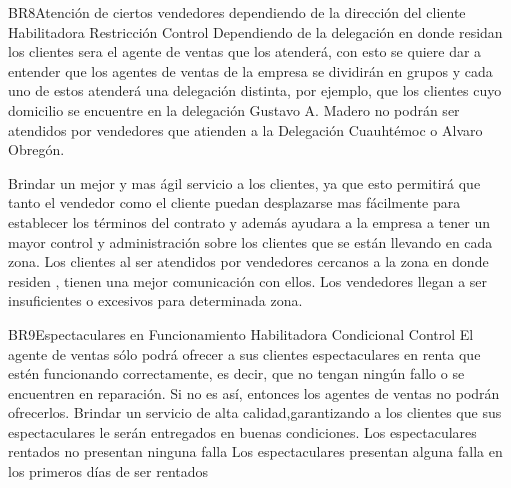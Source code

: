 \hypertarget{BR:BR8}{}
\begin{BussinesRule}{BR8}{Atención de ciertos vendedores dependiendo de la dirección del cliente}
    \BRitem[Tipo: ] Habilitadora
    \BRitem[Clase:] Restricción
    \BRitem[Nivel:] Control
    \BRitem[Descripción:]Dependiendo de la delegación en donde residan los clientes sera el agente de ventas que los atenderá, con esto se quiere dar a entender que los agentes de ventas de la empresa se dividirán en grupos y cada uno de estos atenderá una delegación distinta, por ejemplo, que  los clientes cuyo domicilio se encuentre en la delegación Gustavo A. Madero no podrán ser atendidos por vendedores que atienden a la Delegación Cuauhtémoc o Alvaro Obregón.
  
    \BRitem[Motivación: ]Brindar un mejor y mas ágil servicio a los clientes, ya que esto permitirá que tanto el vendedor como el cliente puedan desplazarse mas fácilmente para establecer los términos del contrato y además ayudara a la empresa a tener un mayor control y administración sobre los clientes que se están llevando en cada zona. 
     Los clientes al ser atendidos por vendedores cercanos a la zona en donde residen , tienen una mejor comunicación con ellos.
     Los vendedores llegan a ser insuficientes o excesivos para determinada zona.
\end{BussinesRule}

\hypertarget{BR:BR9}{}
\begin{BussinesRule}{BR9}{Espectaculares en Funcionamiento}
    \BRitem[Tipo: ] Habilitadora
    \BRitem[Clase:] Condicional
    \BRitem[Nivel:] Control
    \BRitem[Descripción:]El agente de ventas sólo podrá ofrecer a sus clientes espectaculares en renta que estén funcionando correctamente, es decir, que no tengan ningún fallo o se encuentren en reparación. Si no es así, entonces los agentes de ventas no podrán ofrecerlos. 
    \BRitem[Motivación:] Brindar un servicio de alta calidad,garantizando a los clientes que sus espectaculares le serán entregados en buenas condiciones.
    Los espectaculares rentados no presentan ninguna falla
     Los espectaculares presentan alguna falla en los primeros días de ser rentados
\end{BussinesRule}


